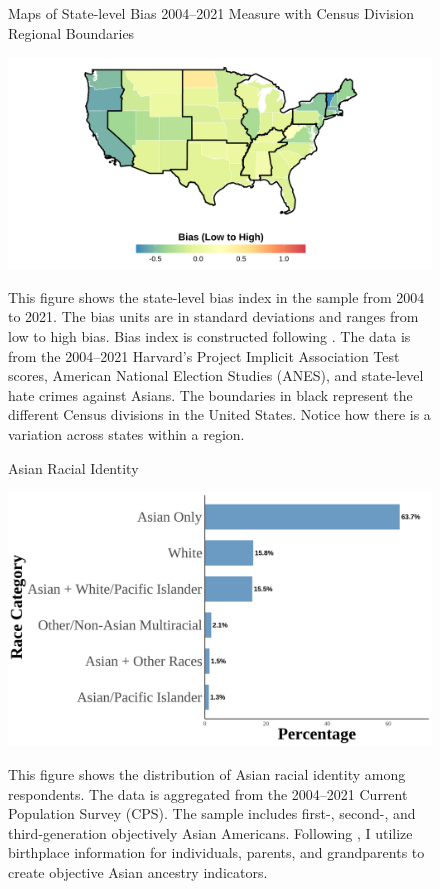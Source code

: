 \begin{center}
\begin{figure}[H]
\caption{Maps of State-level Bias 2004--2021 Measure with Census Division Regional Boundaries}
\includegraphics[width=\textwidth]{Average_Skinmap.png} 
\label{fig:iat-map-all}
\caption*{\footnotesize{This figure shows the state-level bias index in the sample from 2004 to 2021. The bias units are in standard deviations and ranges from low to high bias. Bias index is constructed following \textcite{lubotskyInterpretationRegressionsMultiple2006}. The data is from the 2004--2021 Harvard's Project Implicit Association Test scores, American National Election Studies (ANES), and state-level hate crimes against Asians. The boundaries in black represent the different Census divisions in the United States. Notice how there is a variation across states within a region.}}
\end{figure}
\end{center}

\newpage
\pagebreak

\begin{center}
\begin{figure}[H]
\caption{Asian Racial Identity}
\includegraphics[width=\textwidth]{histogram_asian_american_race_aggregated.png} 
\label{fig:histogram-all}
\caption*{\footnotesize{This figure shows the distribution of Asian racial identity among respondents. 
The data is aggregated from the 2004--2021 Current Population Survey (CPS). 
The sample includes first-, second-, and third-generation objectively Asian Americans.
Following \textcite{antmanEthnicAttritionObserved2016,antmanEthnicAttritionAssimilation2020}, 
I utilize birthplace information for individuals, parents, and grandparents to create objective Asian ancestry indicators.
}}
\end{figure}
\end{center}

